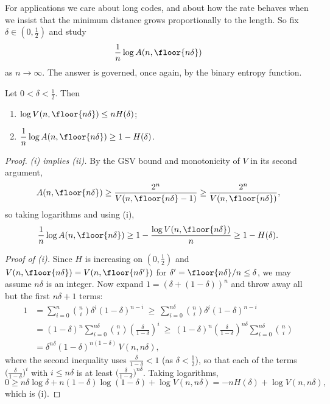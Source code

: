 For applications we care about long codes, and about how the rate behaves when we insist that the minimum distance grows proportionally to the length. So fix $\delta \in (0,\tfrac12)$ and study
$$\frac{1}{n}\log A(n, \floor{n\delta})$$
as $n \to \infty$. The answer is governed, once again, by the binary entropy function.

\begin{proposition}\label{prop:volbound}
	Let $0 < \delta < \tfrac12$. Then
	\begin{enumerate}[label=(\roman*)]
		\item $\log V(n,\floor{n\delta}) \le n H(\delta)$;
		\item $\dfrac{1}{n}\log A(n,\floor{n\delta}) \ge 1 - H(\delta)$.
	\end{enumerate}
\end{proposition}

\begin{proof}
	\emph{(i) implies (ii).} By the GSV bound and monotonicity of $V$ in its second argument,
	$$A(n,\floor{n\delta}) \ge \frac{2^n}{V(n,\floor{n\delta}-1)} \ge \frac{2^n}{V(n,\floor{n\delta})},$$
	so taking logarithms and using (i),
	$$\frac1n \log A(n,\floor{n\delta}) \ge 1 - \frac{\log V(n,\floor{n\delta})}{n} \ge 1 - H(\delta).$$

	\emph{Proof of (i).} Since $H$ is increasing on $(0,\tfrac12)$ and $V(n, \floor{n\delta}) = V(n, \floor{n\delta'})$ for $\delta' = \floor{n\delta}/n \le \delta$, we may assume $n\delta$ is an integer. Now expand $1 = (\delta + (1-\delta))^n$ and throw away all but the first $n\delta+1$ terms:
	\begin{align*}
		1 &= \sum_{i=0}^n \binom{n}{i}\delta^i(1-\delta)^{n-i} \ \ge\  \sum_{i=0}^{n\delta}\binom{n}{i}\delta^i(1-\delta)^{n-i}\\
		&= (1-\delta)^n \sum_{i=0}^{n\delta}\binom{n}{i}\left(\frac{\delta}{1-\delta}\right)^{\!i} \ \ge\  (1-\delta)^n\left(\frac{\delta}{1-\delta}\right)^{\!n\delta}\sum_{i=0}^{n\delta}\binom{n}{i}\\
		&= \delta^{n\delta}(1-\delta)^{n(1-\delta)}\,V(n,n\delta),
	\end{align*}
	where the second inequality uses $\frac{\delta}{1-\delta} < 1$ (as $\delta< \tfrac12$), so that each of the terms $\bigl(\tfrac{\delta}{1-\delta}\bigr)^i$ with $i \le n\delta$ is at least $\bigl(\tfrac{\delta}{1-\delta}\bigr)^{n\delta}$. Taking logarithms,
	$$0 \ge n\delta \log\delta + n(1-\delta)\log(1-\delta) + \log V(n,n\delta) = -nH(\delta) + \log V(n,n\delta),$$
	which is (i).
\end{proof}

